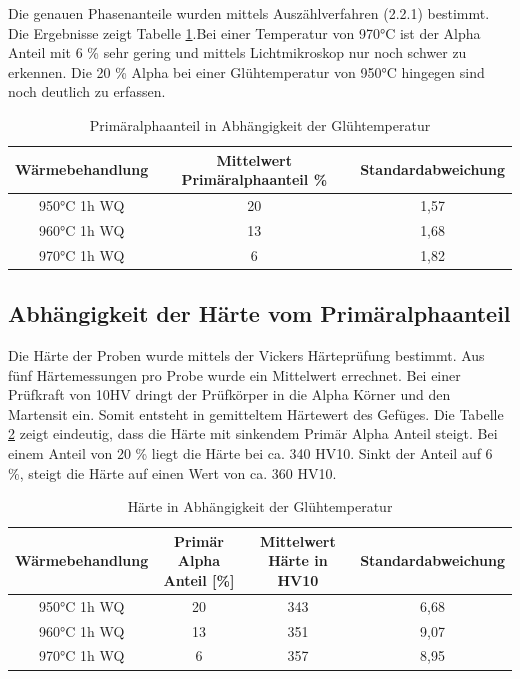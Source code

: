 \documentclass[a4paper, 11pt]{tubsreprt}
\begin{document}
Die genauen Phasenanteile wurden mittels Auszählverfahren (2.2.1) bestimmt. Die Ergebnisse zeigt Tabelle \ref{Tabelle Primäralphaanteil}.Bei einer Temperatur von 970°C ist der Alpha Anteil mit  6 \% sehr gering und mittels Lichtmikroskop nur noch schwer zu erkennen. Die 20 \% Alpha bei einer Glühtemperatur von 950°C hingegen sind noch deutlich zu erfassen.
\begin{table}
\begin{tabular}{c | c | c}
Wärmebehandlung & Mittelwert Primäralphaanteil \% & Standardabweichung \\
\hline
950°C 1h WQ	& 20 	&	1,57 \\
960°C 1h WQ	& 13 	&	1,68 \\
970°C 1h WQ	& 6  	&	1,82 \\
\end{tabular}
\caption{Primäralphaanteil in Abhängigkeit der Glühtemperatur}
\label{Tabelle Primäralphaanteil}
\end{table}

\subsection{Abhängigkeit der Härte vom Primäralphaanteil} \label{Kapitel Abhängigkeit der Härte vom Primäralphaanteil}
Die Härte der Proben wurde mittels der Vickers Härteprüfung bestimmt. Aus fünf Härtemessungen pro Probe wurde ein Mittelwert errechnet. Bei einer Prüfkraft von 10HV dringt der Prüfkörper in die Alpha Körner und den Martensit ein. Somit entsteht in gemitteltem Härtewert des Gefüges. Die Tabelle \ref{Härte in Abhängigkeit der Glühtemperatur} zeigt eindeutig, dass die Härte mit sinkendem Primär Alpha Anteil steigt. Bei einem Anteil von 20 \% liegt die Härte bei ca. 340 HV10. Sinkt der Anteil auf 6 \%, steigt die Härte auf einen Wert von ca. 360 HV10.

\begin{table}	%
\begin{tabular}{c|c|c|c}
Wärmebehandlung	& Primär Alpha Anteil [\%] &	Mittelwert 
Härte in HV10 	& Standardabweichung \\
\hline
950°C 1h WQ	& 	20	&	343	&	6,68 \\
960°C 1h WQ	&	13	&	351	&	9,07 \\
970°C 1h WQ	&	6	&	357	&	8,95 \\

\end{tabular}
\caption{Härte in Abhängigkeit der Glühtemperatur}
\label{Härte in Abhängigkeit der Glühtemperatur}
\end{table}
\end{document}
